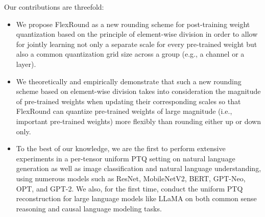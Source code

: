\documentclass{article}
\theoremstyle{plain}
\theoremstyle{definition}
\theoremstyle{remark}
\begin{document}

Our contributions are threefold:
\begin{itemize}
    \item We propose FlexRound as a new rounding scheme for post-training weight quantization based on the principle of element-wise division in order to allow for jointly learning not only a separate scale for every pre-trained weight but also a common quantization grid size across a group (e.g., a channel or a layer).
    \item We theoretically and empirically demonstrate that such a new rounding scheme based on element-wise division takes into consideration the magnitude of pre-trained weights when updating their corresponding scales so that FlexRound can quantize pre-trained weights of large magnitude (i.e., important pre-trained weights) more flexibly than rounding either up or down only.
    \item To the best of our knowledge, we are the first to perform extensive experiments in a per-tensor uniform PTQ setting on 
    natural language generation as well as image classification and natural language understanding, using numerous models such as ResNet, MobileNetV2, BERT, GPT-Neo, OPT, and GPT-2. We also, for the first time, conduct the uniform PTQ reconstruction for large language models like LLaMA on both common sense reasoning and causal language modeling tasks. %
\end{itemize}
\end{document}
